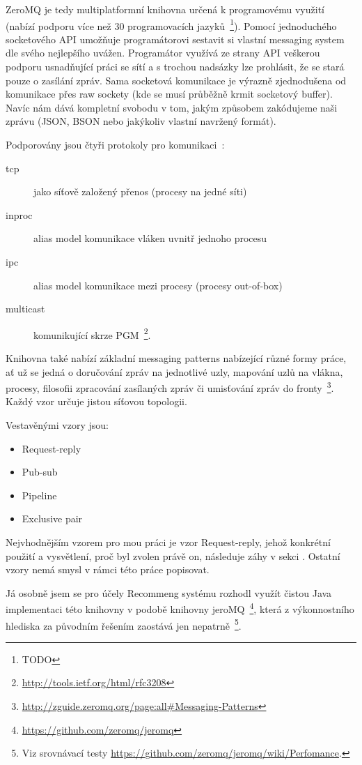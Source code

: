 \documentclass[thesis=M,czech]{FITthesis}[2014/05/07]
\begin{document}
ZeroMQ je tedy multiplatformní knihovna určená k programovému využití (nabízí podporu více než 30 programovacích jazyků~\footnote{TODO}). Pomocí jednoduchého socketového API umožňuje programátorovi sestavit si vlastní messaging system dle svého nejlepšího uvážen. Programátor využívá ze strany API veškerou podporu usnadňující práci se sítí a s trochou nadsázky lze prohlásit, že se stará pouze o zasílání zpráv. Sama socketová komunikace je výrazně zjednodušena od komunikace přes raw sockety (kde se musí průběžně krmit socketový buffer). Navíc nám dává kompletní svobodu v tom, jakým způsobem zakódujeme naši zprávu (JSON, BSON nebo jakýkoliv vlastní navržený formát).

Podporovány jsou čtyři protokoly pro komunikaci~\cite{zeromq1}:

\begin{description}
	\item[tcp] jako síťově založený přenos (procesy na jedné síti)
	\item[inproc] alias model komunikace vláken uvnitř jednoho procesu
	\item[ipc] alias model komunikace mezi procesy (procesy out-of-box)
	\item[multicast]	komunikující skrze PGM~\footnote{\url{http://tools.ietf.org/html/rfc3208}}.
\end{description}

Knihovna také nabízí základní messaging patterns nabízející různé formy práce, ať už se jedná o doručování zpráv na jednotlivé uzly, mapování uzlů na vlákna, procesy, filosofii zpracování zasílaných zpráv či umisťování zpráv do fronty~\footnote{\url{http://zguide.zeromq.org/page:all\#Messaging-Patterns}}. Každý vzor určuje jistou síťovou topologii.

Vestavěnými vzory jsou:

\begin{itemize}
	\item Request-reply
	\item Pub-sub
	\item Pipeline		
	\item Exclusive pair
\end{itemize}

Nejvhodnějším vzorem pro mou práci je vzor Request-reply, jehož konkrétní použití a vysvětlení, proč byl zvolen právě on, následuje záhy v sekci . Ostatní vzory nemá smysl v rámci této práce popisovat.

Já osobně jsem se pro účely Recommeng systému rozhodl využít čistou Java implementaci této knihovny v podobě knihovny jeroMQ~\footnote{\url{https://github.com/zeromq/jeromq}}, která z výkonnostního hlediska za původním řešením zaostává jen nepatrně~\footnote{Viz srovnávací testy \url{https://github.com/zeromq/jeromq/wiki/Perfomance}.}.
\end{document}
